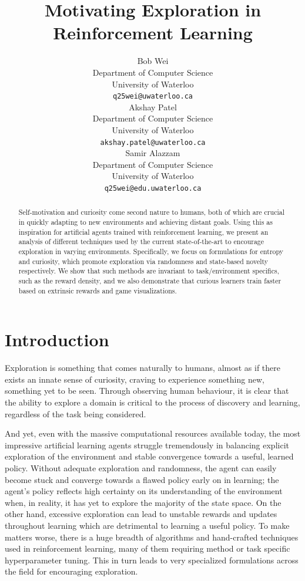 \documentclass{article}
\title{Motivating Exploration in Reinforcement Learning}
\author{
  Bob Wei\\
  Department of Computer Science\\
  University of Waterloo\\
  \texttt{q25wei@uwaterloo.ca} \\
  \And
  Akshay Patel \\
  Department of Computer Science\\
  University of Waterloo\\
  \texttt{akshay.patel@uwaterloo.ca} \\
  \AND
  Samir Alazzam \\
  Department of Computer Science\\
  University of Waterloo\\
  \texttt{q25wei@edu.uwaterloo.ca} \\
}
\begin{document}
\maketitle

\begin{abstract}
Self-motivation and curiosity come second nature to humans, both of which are crucial in quickly adapting to new environments and achieving distant goals. Using this as inspiration for artificial agents trained with reinforcement learning, we present an analysis of different techniques used by the current state-of-the-art to encourage exploration in varying environments. Specifically, we focus on formulations for entropy and curiosity, which promote exploration via randomness and state-based novelty respectively. We show that such methods are invariant to task/environment specifics, such as the reward density, and we also demonstrate that curious learners train faster based on extrinsic rewards and game visualizations.
\end{abstract}

\section{Introduction}

Exploration is something that comes naturally to humans, almost as if there exists an innate sense of curiosity, craving to experience something new, something yet to be seen. Through observing human behaviour, it is clear that the ability to explore a domain is critical to the process of discovery and learning, regardless of the task being considered.

And yet, even with the massive computational resources available today, the most impressive artificial learning agents struggle tremendously in balancing explicit exploration of the environment and stable convergence towards a useful, learned policy. Without adequate exploration and randomness, the agent can easily become stuck and converge towards a flawed policy early on in learning; the agent's policy reflects high certainty on its understanding of the environment when, in reality, it has yet to explore the majority of the state space. On the other hand, excessive exploration can lead to unstable rewards and updates throughout learning which are detrimental to learning a useful policy. To make matters worse, there is a huge breadth of algorithms and hand-crafted techniques used in reinforcement learning, many of them requiring method or task specific hyperparameter tuning. This in turn leads to very specialized formulations across the field for encouraging exploration.
\end{document}
